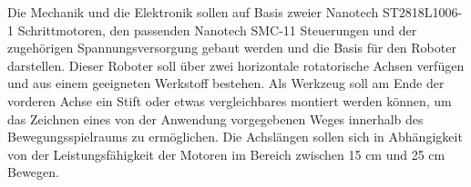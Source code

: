 \begin{itemize}
\begin{itemize}
Die Mechanik und die Elektronik sollen auf Basis zweier Nanotech ST2818L1006-1 Schrittmotoren, den passenden Nanotech SMC-11 Steuerungen und der zugehörigen Spannungsversorgung gebaut werden und die Basis für den Roboter darstellen. Dieser Roboter soll über zwei horizontale rotatorische Achsen verfügen und aus einem geeigneten Werkstoff bestehen. Als Werkzeug soll am Ende der vorderen Achse ein Stift oder etwas vergleichbares montiert werden können, um das Zeichnen eines von der Anwendung vorgegebenen Weges innerhalb des Bewegungsspielraums zu ermöglichen. Die Achslängen sollen sich in Abhängigkeit von der Leistungsfähigkeit der Motoren im Bereich zwischen 15 cm und 25 cm Bewegen.
\end{itemize}  
\end{itemize}


 


